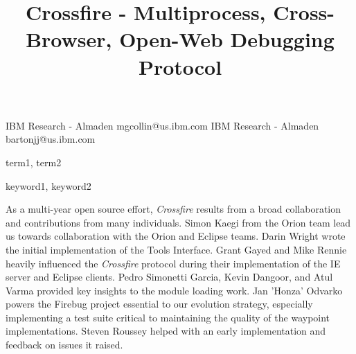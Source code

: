 \documentclass[preprint, 10pt]{sigplanconf}
\begin{document}
\copyrightdata{[to be supplied]}


\title{Crossfire - Multiprocess, Cross-Browser, Open-Web Debugging Protocol}


           {IBM Research - Almaden}
           {mgcollin@us.ibm.com}
           {IBM Research - Almaden}
           {bartonjj@us.ibm.com}

\maketitle




\terms
term1, term2

\keywords
keyword1, keyword2



%








\acks
As a multi-year open source effort, \textit{Crossfire} results from a broad collaboration and 
contributions from many individuals. Simon Kaegi from the Orion team lead us towards collaboration with the Orion and Eclipse teams. Darin Wright wrote the initial implementation of the Tools Interface. Grant Gayed and Mike Rennie heavily influenced the \textit{Crossfire} protocol during their implementation of the IE server and Eclipse clients. Pedro Simonetti Garcia, Kevin Dangoor, and Atul Varma provided key insights to the module loading work. Jan 'Honza' Odvarko powers the Firebug project essential to our evolution strategy, especially implementing a test suite critical to maintaining the quality of the waypoint implementations. Steven Roussey helped with an early implementation and feedback on issues it raised.







%

\end{document}
